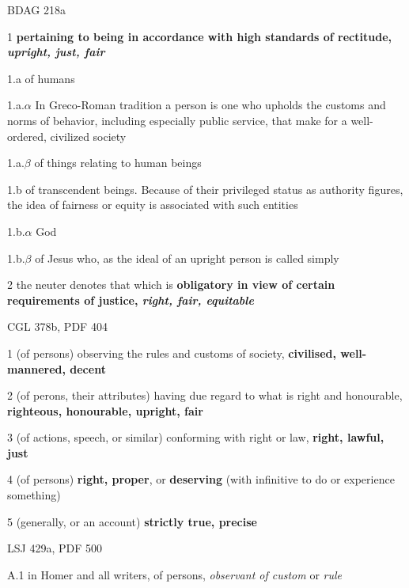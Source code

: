 				\begin{compactdesc}
					\item[BDAG 218a] \textbf{}
						\begin{compactitem}
							\item[1] \textbf{pertaining to being in accordance with high standards of rectitude, \textit{upright, just, fair}}
							\item[1.a] of humans
							\item[1.a.$\alpha$] In Greco-Roman tradition a  person is one who upholds the customs and norms of behavior, including especially public service, that make for a well-ordered, civilized society
							\item[1.a.$\beta$] of things relating to human beings
							\item[1.b] of transcendent beings. Because of their privileged status as authority figures, the idea of fairness or equity is associated with such entities
							\item[1.b.$\alpha$] God
							\item[1.b.$\beta$] of Jesus who, as the ideal of an upright person is called simply 
							\item[2] the neuter denotes that which is \textbf{obligatory in view of certain requirements of justice, \textit{right, fair, equitable}}
						\end{compactitem}
					\item[CGL 378b, PDF 404] \textbf{}
						\begin{compactitem}
							\item[1] (of persons) observing the rules and customs of society, \textbf{civilised, well-mannered, decent}
							\item[2] (of perons, their attributes) having due regard to what is right and honourable, \textbf{righteous, honourable, upright, fair}
							\item[3] (of actions, speech, or similar) conforming with right or law, \textbf{right, lawful, just}
							\item[4] (of persons) \textbf{right, proper}, or \textbf{deserving} (with infinitive to do or experience something)
							\item[5] (generally, or an account) \textbf{strictly true, precise}
						\end{compactitem}
					\item[LSJ 429a, PDF 500] \textbf{}
						\begin{compactitem}
							\item[A.1] in Homer and all writers, of persons, \textit{observant of custom} or \textit{rule}

\end{compactitem}
\end{compactdesc}
